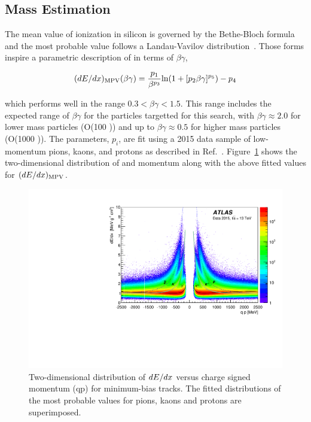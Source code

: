 \subsection{Mass Estimation}
\label{sec:mass_requirement}
The mean value of ionization in silicon is governed by the Bethe-Bloch formula and the most probable value follows a Landau-Vavilov distribution~\cite{pdg}. 
Those forms inspire a parametric description of \dedx in terms of $\beta\gamma$, 

\begin{equation}
(dE/dx)_\mathrm{MPV}(\beta \gamma) = {p_1\over \beta^{p_3}}\mathrm{ln}(1+[p_2\beta\gamma]^{p_5})-p_4 \label{eq:bbfun}
\end{equation}

\noindent which performs well in the range $0.3< \beta\gamma<1.5$.
This range includes the expected range of $\beta\gamma$ for the particles targetted for this search, with $\beta\gamma \approx 2.0$ for lower mass particles (O(100 \GeV)) and up to $\beta\gamma \approx 0.5$ for higher mass particles (O(1000 \GeV)). 
The parameters, $p_i$, are fit using a 2015 data sample of low-momentum pions, kaons, and protons as described in Ref.~\cite{ATLAS-CONF-2011-016}. 
Figure~\ref{fig:dedx_momentum} shows the two-dimensional distribution of \dedx and momentum along with the above fitted values for $(dE/dx)_\mathrm{MPV}$.

\begin{figure}
\centering
\includegraphics[width=\fullfig]{figures/dedx_momentum.pdf}
\caption{Two-dimensional distribution of $dE/dx$ versus charge signed momentum (qp) for minimum-bias tracks. The fitted distributions of the most probable values for pions, kaons and protons are superimposed.}
\label{fig:dedx_momentum}
\end{figure}


